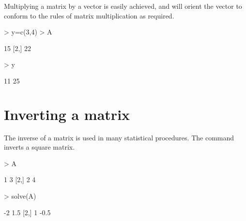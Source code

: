 Multiplying a matrix by a vector is easily achieved, and \R{} will orient the vector to conform to the rules of matrix multiplication as required.
\begin{Schunk}
\begin{Sinput}
> y=c(3,4)
> A%*%y
\end{Sinput}
\begin{Soutput}
     [,1]
[1,]   15
[2,]   22
\end{Soutput}
\begin{Sinput}
> y%*%A
\end{Sinput}
\begin{Soutput}
     [,1] [,2]
[1,]   11   25
\end{Soutput}
\end{Schunk}

\section{Inverting a matrix}

The inverse of a matrix is used in many statistical procedures. The  command inverts a square matrix.
\begin{Schunk}
\begin{Sinput}
> A
\end{Sinput}
\begin{Soutput}
     [,1] [,2]
[1,]    1    3
[2,]    2    4
\end{Soutput}
\begin{Sinput}
> solve(A)
\end{Sinput}
\begin{Soutput}
     [,1] [,2]
[1,]   -2  1.5
[2,]    1 -0.5
\end{Soutput}
\end{Schunk}

